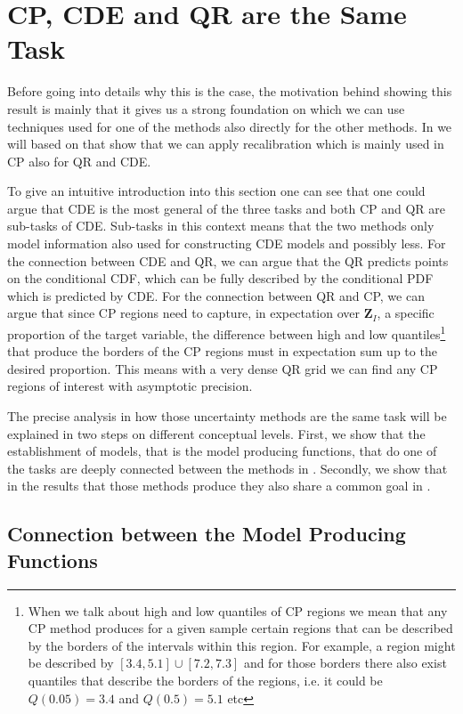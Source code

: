 \section{CP, CDE and QR are the Same Task}\label{sec:cp_sub_cde}

Before going into details why this is the case, the motivation behind showing this result is mainly that it gives us a strong foundation on which we can use techniques used for one of the methods also directly for the other methods. In  we will based on that show that we can apply recalibration which is mainly used in CP also for QR and CDE.

To give an intuitive introduction into this section one can see that one could argue that CDE is the most general of the three tasks and both CP and QR are sub-tasks of CDE. Sub-tasks in this context means that the two methods only model information also used for constructing CDE models and possibly less. For the connection between CDE and QR, we can argue that the QR predicts points on the conditional CDF, which can be fully described by the conditional PDF which is predicted by CDE. For the connection between QR and CP, we can argue that since CP regions need to capture, in expectation over $\mathbf{Z}_I$, a specific proportion of the target variable, the difference between high and low quantiles\footnote{When we talk about high and low quantiles of CP regions we mean that any CP method produces for a given sample certain regions that can be described by the borders of the intervals within this region. For example, a region might be described by $[3.4, 5.1] \cup [7.2, 7.3]$ and for those borders there also exist quantiles that describe the borders of the regions, i.e. it could be $Q(0.05) = 3.4$ and $Q(0.5) = 5.1$ etc} that produce the borders of the CP regions must in expectation sum up to the desired proportion. This means with a very dense QR grid we can find any CP regions of interest with asymptotic precision.

The precise analysis in how those uncertainty methods are the same task will be explained in two steps on different conceptual levels. First, we show that the establishment of models, that is the model producing functions, that do one of the tasks are deeply connected between the methods in . Secondly, we show that in the results that those methods produce they also share a common goal in .

\subsection{Connection between the Model Producing Functions}\label{sec:connection_model_producing}


